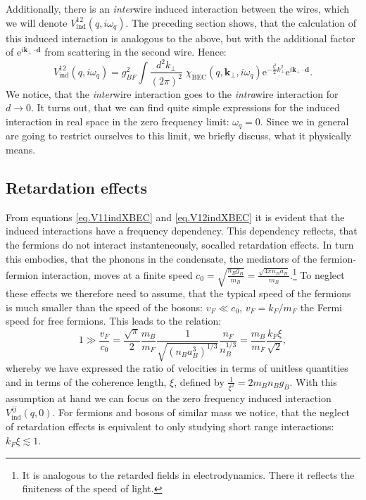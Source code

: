 Additionally, there is an \textit{inter}wire induced interaction between the wires, which we will denote $V_{\text{ind}}^{12}(q,i\omega_q)$. The preceding section shows, that the calculation of this induced interaction is analogous to the above, but with the additional factor of $\text{e}^{i\mathbf{k}_\perp\cdot \mathbf{d}}$ from scattering in the second wire. Hence:
\begin{equation}
V_{\text{ind}}^{12}(q,i\omega_q) = g_{BF}^2\int\frac{d^2k_\perp}{(2\pi)^2}\; \chi_\text{BEC}(q,\mathbf{k}_\perp, i\omega_q)\text{e}^{-\frac{l_t^2}{2}k_\perp^2}\text{e}^{i\mathbf{k}_\perp\cdot \mathbf{d}}. 
\label{eq.V12indXBEC} 
\end{equation}
We notice, that the \textit{inter}wire interaction goes to the \textit{intra}wire interaction for $d \to 0$. It turns out, that we can find quite simple expressions for the induced interaction in real space in the zero frequency limit: $\omega_q = 0$. Since we in general are going to restrict ourselves to this limit, we briefly discuss, what it physically means. 

\subsection{Retardation effects} \label{sec.RetardationEffects}
From equations \eqref{eq.V11indXBEC} and \eqref{eq.V12indXBEC} it is evident that the induced interactions have a frequency dependency. This dependency reflects, that the fermions do not interact instanteneously, socalled retardation effects. In turn this embodies, that the phonons in the condensate, the mediators of the fermion-fermion interaction, moves at a finite speed $c_0 = \sqrt{\frac{n_Bg_B}{m_B}} = \frac{\sqrt{4\pi n_B a_B}}{m_B}$.\footnote{It is analogous to the retarded fields in electrodynamics. There it reflects the finiteness of the speed of light.} To neglect these effects we therefore need to assume, that the typical speed of the fermions is much smaller than the speed of the bosons: $v_F \ll c_0$, $v_F = k_F/m_F$ the Fermi speed for free fermions. This leads to the relation:
\begin{equation}
1 \gg \frac{v_F}{c_0} = \frac{\sqrt{\pi}}{2} \frac{m_B}{m_F}\frac{1}{ \sqrt{ (n_Ba_B^3)^{1/3} } }\frac{n_F}{ n_B^{1/3} } = \frac{m_B}{m_F}\frac{k_F\xi}{\sqrt{2}}, 
\label{eq.RetardationEffectsneglectionassumption}
\end{equation}
whereby we have expressed the ratio of velocities in terms of unitless quantities and in terms of the coherence length, $\xi$, defined by $\frac{1}{\xi^2} = 2m_Bn_Bg_B$. With this assumption at hand we can focus on the zero frequency induced interaction $V^{ij}_{\text{ind}}(q,0)$. For fermions and bosons of similar mass we notice, that the neglect of retardation effects is equivalent to only studying short range interactions: $k_F\xi \lesssim 1$. 

